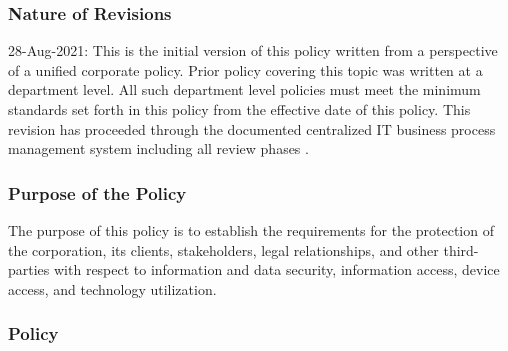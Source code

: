 \documentclass[stu]{apa7}
\begin{document}
\subsubsection{Nature of Revisions}
\label{sec:org80f86d9}

28-Aug-2021: This is the initial version of this policy written from a perspective of a unified corporate policy. Prior policy covering this topic was written at a department level. All such department level policies must meet the minimum standards set forth in this policy from the effective date of this policy. This revision has proceeded through the documented centralized IT business process management system including all review phases \cite{wagleDevelopmentEffectiveCentralized2021}.

\subsubsection{Purpose of the Policy}
\label{sec:org4cdb1be}

The purpose of this policy is to establish the requirements for the protection of the corporation, its clients, stakeholders, legal relationships, and other third-parties with respect to information and data security, information access, device access, and technology utilization.


\subsubsection{Policy}
\label{sec:org7200004}
\end{document}
